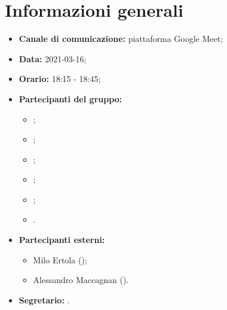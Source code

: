\section{Informazioni generali}
\begin{itemize}
\item \textbf{Canale di comunicazione:} piattaforma Google Meet;
\item \textbf{Data:} 2021-03-16;
\item \textbf{Orario:} 18:15 - 18:45;
\item \textbf{Partecipanti del gruppo:}
	\begin{itemize}
	\item \MDI ;
	\item \MB ;
	\item \GB ;
	\item \VAS ;
	\item \FD ;
	\item \SB .
	\end{itemize}
\item \textbf{Partecipanti esterni:}
	\begin{itemize}
	\item Milo Ertola (\Proponente);
	\item Alessandro Maccagnan (\Proponente).
	\end{itemize}
\item \textbf{Segretario:} \MB .

\end{itemize}